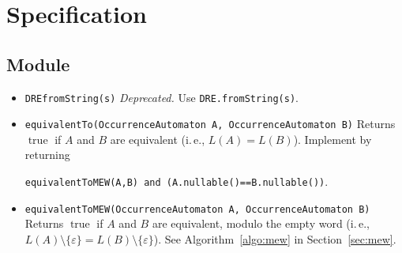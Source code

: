 \documentclass[a4paper,11pt, svgnames,titlepage]{article}
\newcommand{\emptyword}{\varepsilon}
\DeclareMathOperator{\incomp}{\#}
\newcommand{\true}{\ensuremath{\operatorname{true}}\xspace}
\begin{document}
\section{Specification}\label{sec:spec}
\subsection{Module}\label{sec:des:mod}
\begin{itemize}
	\item\texttt{DREfromString(s)} \emph{Deprecated.} Use \texttt{DRE.fromString(s)}.
\item\texttt{equivalentTo(OccurrenceAutomaton A, OccurrenceAutomaton B)} Returns $\true$ if $A$ and $B$ are equivalent (i.\,e., $L(A)=L(B)$). Implement by returning 
\begin{center}
	\texttt{equivalentToMEW(A,B) and (A.nullable()==B.nullable())}.
\end{center}
\item\texttt{equivalentToMEW(OccurrenceAutomaton A, OccurrenceAutomaton B)} Returns $\true$ if $A$ and $B$ are equivalent, modulo the empty word (i.\,e., $L(A)\setminus\{\emptyword\}=L(B)\setminus\{\emptyword\}$). See Algorithm~\ref{algo:mew} in Section~\ref{sec:mew}.
\end{itemize}
\end{document}
